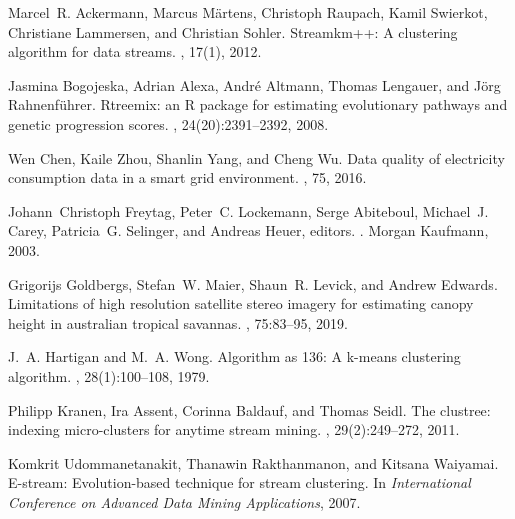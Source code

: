 \documentclass[runningheads]{llncs}
\begin{document}
%
%
%
% 
% 
%
\begin{thebibliography}{8}
Marcel~R. Ackermann, Marcus M{\"{a}}rtens, Christoph Raupach, Kamil Swierkot,
Christiane Lammersen, and Christian Sohler.
\newblock Streamkm++: {A} clustering algorithm for data streams.
, 17(1), 2012.

Jasmina Bogojeska, Adrian Alexa, Andr{\'{e}} Altmann, Thomas Lengauer, and
J{\"{o}}rg Rahnenf{\"{u}}hrer.
\newblock Rtreemix: an {R} package for estimating evolutionary pathways and
genetic progression scores.
, 24(20):2391--2392, 2008.

Wen Chen, Kaile Zhou, Shanlin Yang, and Cheng Wu.
\newblock Data quality of electricity consumption data in a smart grid
environment.
, 75, 2016.

Johann~Christoph Freytag, Peter~C. Lockemann, Serge Abiteboul, Michael~J.
Carey, Patricia~G. Selinger, and Andreas Heuer, editors.
. Morgan
Kaufmann, 2003.

Grigorijs Goldbergs, Stefan~W. Maier, Shaun~R. Levick, and Andrew Edwards.
\newblock Limitations of high resolution satellite stereo imagery for
estimating canopy height in australian tropical savannas.
,
75:83--95, 2019.

J.~A. Hartigan and M.~A. Wong.
\newblock Algorithm as 136: A k-means clustering algorithm.
, 28(1):100--108, 1979.

Philipp Kranen, Ira Assent, Corinna Baldauf, and Thomas Seidl.
\newblock The clustree: indexing micro-clusters for anytime stream mining.
, 29(2):249--272, 2011.

Komkrit Udommanetanakit, Thanawin Rakthanmanon, and Kitsana Waiyamai.
\newblock E-stream: Evolution-based technique for stream clustering.
\newblock In {\em International Conference on Advanced Data Mining 	Applications}, 2007.


\end{thebibliography}
\end{document}

